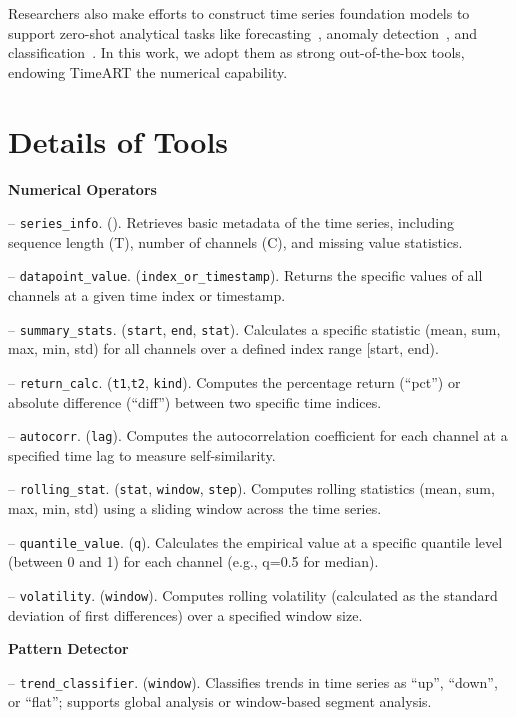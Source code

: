 Researchers also make efforts to construct time series foundation models to support zero-shot analytical tasks like forecasting~\citep{wang2025lightgts,wu2025flame}, anomaly detection~\citep{units,shentu2024towards}, and classification~\citep{AimTS}. In this work, we adopt them as strong out-of-the-box tools, endowing TimeART the numerical capability.

\section{Details of Tools}
\label{app: tool}

\textbf{Numerical Operators}

\noindent-- \texttt{series\_info}. (). Retrieves basic metadata of the time series, including sequence length (T), number of channels (C), and missing value statistics.

\noindent-- \texttt{datapoint\_value}. (\texttt{index\_or\_timestamp}). Returns the specific values of all channels at a given time index or timestamp.

\noindent-- \texttt{summary\_stats}. (\texttt{start}, \texttt{end}, \texttt{stat}). Calculates a specific statistic (mean, sum, max, min, std) for all channels over a defined index range [start, end).

\noindent-- \texttt{return\_calc}. (\texttt{t1},\texttt{t2}, \texttt{kind}). Computes the percentage return (``pct'') or absolute difference (``diff'') between two specific time indices.

\noindent-- \texttt{autocorr}. (\texttt{lag}). Computes the autocorrelation coefficient for each channel at a specified time lag to measure self-similarity.

\noindent-- \texttt{rolling\_stat}. (\texttt{stat}, \texttt{window}, \texttt{step}). Computes rolling statistics (mean, sum, max, min, std) using a sliding window across the time series.

\noindent-- \texttt{quantile\_value}. (\texttt{q}). Calculates the empirical value at a specific quantile level (between 0 and 1) for each channel (e.g., q=0.5 for median).

\noindent-- \texttt{volatility}. (\texttt{window}). Computes rolling volatility (calculated as the standard deviation of first differences) over a specified window size.

\textbf{Pattern Detector}

\noindent-- \texttt{trend\_classifier}. (\texttt{window}). Classifies trends in time series as ``up'', ``down'', or ``flat''; supports global analysis or window-based segment analysis.

